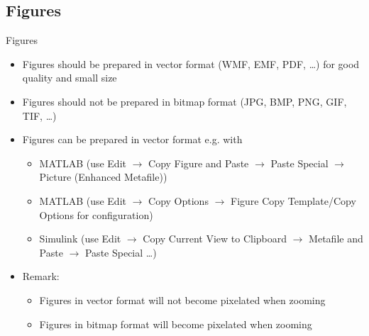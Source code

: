 \documentclass{beamer}
\begin{document}
\subsection[fragile]{Figures}
\begin{frame}{Figures}
\begin{itemize}
    \item Figures should be prepared in vector format (WMF, EMF, PDF, \ldots) for good quality and small size
    \item Figures should not be prepared in bitmap format (JPG, BMP, PNG, GIF, TIF, \ldots)
    \item Figures can be prepared in vector format e.g. with
    \begin{itemize}
        \item MATLAB (use Edit $\rightarrow$ Copy Figure and Paste $\rightarrow$ Paste Special $\rightarrow$ Picture (Enhanced Metafile))
        \item MATLAB (use Edit $\rightarrow$ Copy Options $\rightarrow$ Figure Copy Template/Copy Options for configuration)
    
    \item Simulink (use Edit $\rightarrow$ Copy Current View to Clipboard $\rightarrow$ Metafile and Paste $\rightarrow$ Paste Special \ldots)
\end{itemize}
\item Remark:
\begin{itemize}
    \item Figures in vector format will not become pixelated when zooming
    \item Figures in bitmap format will become pixelated when zooming
\end{itemize}
\end{itemize}
\end{frame}
\end{document}
